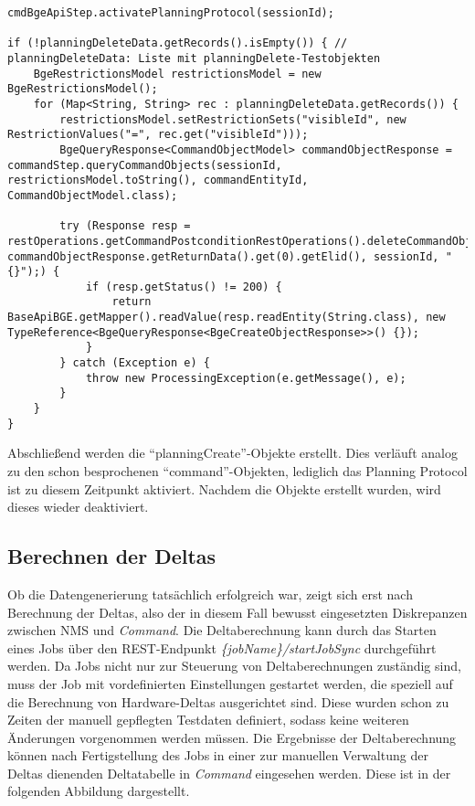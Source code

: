 \begin{lstlisting}[caption=Löschen von \enquote{planningDelete}-Objekten über die BGE, label=deletePlanningDeleteTestObjects,style=Javastyle]
cmdBgeApiStep.activatePlanningProtocol(sessionId);

if (!planningDeleteData.getRecords().isEmpty()) { // planningDeleteData: Liste mit planningDelete-Testobjekten
    BgeRestrictionsModel restrictionsModel = new BgeRestrictionsModel();
    for (Map<String, String> rec : planningDeleteData.getRecords()) {
        restrictionsModel.setRestrictionSets("visibleId", new RestrictionValues("=", rec.get("visibleId")));
        BgeQueryResponse<CommandObjectModel> commandObjectResponse = commandStep.queryCommandObjects(sessionId, restrictionsModel.toString(), commandEntityId, CommandObjectModel.class);

        try (Response resp = restOperations.getCommandPostconditionRestOperations().deleteCommandObject(commandEntityId, commandObjectResponse.getReturnData().get(0).getElid(), sessionId, "{}");) {
            if (resp.getStatus() != 200) {
                return BaseApiBGE.getMapper().readValue(resp.readEntity(String.class), new TypeReference<BgeQueryResponse<BgeCreateObjectResponse>>() {});
            }
        } catch (Exception e) {
            throw new ProcessingException(e.getMessage(), e);
        }
    }
}
\end{lstlisting}

Abschließend werden die \enquote{planningCreate}-Objekte erstellt. Dies verläuft analog zu den schon besprochenen \enquote{command}-Objekten, lediglich das Planning Protocol ist zu diesem Zeitpunkt aktiviert. Nachdem die Objekte erstellt wurden, wird dieses wieder deaktiviert.

\subsection{Berechnen der Deltas}\label{subsec:calculatingDeltas}
Ob die Datengenerierung tatsächlich erfolgreich war, zeigt sich erst nach Berechnung der Deltas, also der in diesem Fall bewusst eingesetzten Diskrepanzen zwischen \ac{NMS} und \textit{Command}. Die Deltaberechnung kann durch das Starten eines Jobs über den \ac{REST}-Endpunkt \textit{\{jobName\}/startJobSync} durchgeführt werden. Da Jobs nicht nur zur Steuerung von Deltaberechnungen zuständig sind, muss der Job mit vordefinierten Einstellungen gestartet werden, die speziell auf die Berechnung von Hardware-Deltas ausgerichtet sind. Diese wurden schon zu Zeiten der manuell gepflegten Testdaten definiert, sodass keine weiteren Änderungen vorgenommen werden müssen. Die Ergebnisse der Deltaberechnung können nach Fertigstellung des Jobs in einer zur manuellen Verwaltung der Deltas dienenden Deltatabelle in \textit{Command} eingesehen werden. Diese ist in der folgenden Abbildung dargestellt.

